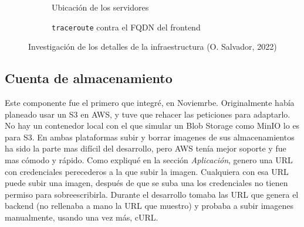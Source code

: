 \documentclass[11pt]{article}
\begin{document}
\begin{flushleft}
		\begin{figure}[htb]
			\begin{subfigure}{\textwidth}
				\centering
				\caption{Ubicación de los servidores}
			\end{subfigure}
			\linebreak
			
			\begin{subfigure}{\textwidth}
				\caption{\texttt{traceroute} contra el FQDN del frontend}
			\end{subfigure}

			
			\caption{Investigación de los detalles de la infraestructura (O. Salvador, 2022)}
		\end{figure}
	
	\bigskip
	\bigskip
	
	
	
	
	
	\subsection{Cuenta de almacenamiento}
	Este componente fue el primero que integré, en Noviemrbe. Originalmente había planeado usar un S3 en AWS, y tuve que rehacer las peticiones para adaptarlo. No hay un contenedor local con el que simular un Blob Storage como MinIO lo es para S3. En ambas plataformas subir y borrar imagenes de sus almacenamientos ha sido la parte mas difícil del desarrollo, pero AWS tenía mejor soporte y fue mas cómodo y rápido. Como expliqué en la sección \textit{Aplicación}, genero una URL con credenciales perecederos a la que subir la imagen. Cualquiera con esa URL puede subir una imagen, después de que se suba una los credenciales no tienen permiso para sobreescribirla. Durante el desarrollo tomaba las URL que genera el backend (no rellenaba a mano la URL que muestro) y probaba a subir imagenes manualmente, usando una vez más, cURL. 
	\linebreak
	

\end{flushleft}
\end{document}
